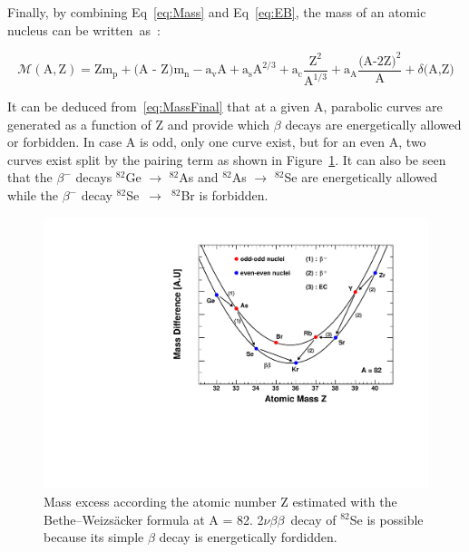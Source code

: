 \documentclass[main.tex]{subfiles}
\begin{document}
\bigskip


\NI Finally, by combining Eq~\ref{eq:Mass} and Eq~\ref{eq:EB}, the mass of an atomic nucleus can be written~as~:


\begin{equation}\label{eq:MassFinal}
\mathcal{M} (\text{A},\text{Z}) = \text{Z}\text{m}_\text{p} + \text{(A - Z)}\text{m}_{\text{n}} - \text{a}_\text{v} \text{A} + \text{a}_\text{s} \text{A}^{\text{2/3}} +  \text{a}_\text{c} \frac{\text{Z}^\text{2}}{\text{A}^{\text{1/3}}} +  \text{a}_\text{A} \frac{\text{(A-2Z)}^\text{2}}{\text{A}} + \delta \text{(A,Z)} 
\end{equation}


\NI It can be deduced from~\ref{eq:MassFinal} that at a given A, parabolic curves are generated as a function of Z and provide which $\beta$ decays are energetically allowed or forbidden. In case A is odd, only one curve exist, but for an even A, two curves exist split by the pairing term as shown in Figure~\ref{WeizsackerParabola}. It can also be seen that the $\beta^-$ decays $^{\text{82}}$Ge $\rightarrow$ $^{\text{82}}$As and $^{\text{82}}$As $\rightarrow$ $^{\text{82}}$Se are energetically allowed while the $\beta^-$ decay $^{\text{82}}$Se~$\rightarrow$~$^{\text{82}}$Br is forbidden.


\begin{figure}[h!]
\begin{center}
\includegraphics[scale=0.55]{pictures/Chap2/WeizsackerParabola_v3.pdf}
\caption{Mass excess according the atomic number Z estimated with the Bethe–Weizsäcker formula at A = 82. 2$\nu\beta\beta$~decay of $^{\text{82}}$Se is possible because its simple $\beta$ decay is energetically fordidden.}
\label{WeizsackerParabola}
\end{center}
\end{figure}
\end{document}
